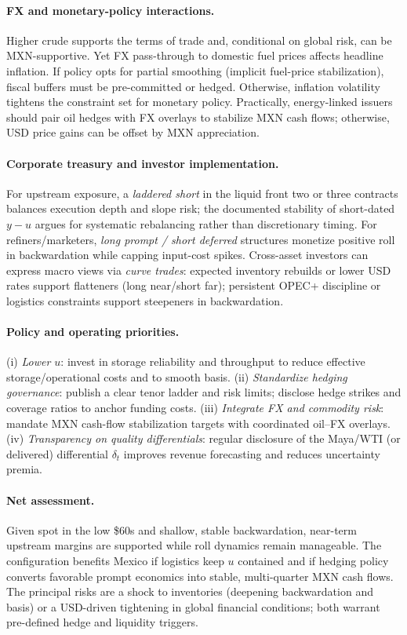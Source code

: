 \documentclass[11pt,a4paper]{article} %
\begin{document}
\paragraph{FX and monetary-policy interactions.}
Higher crude supports the terms of trade and, conditional on global risk, can be MXN-supportive. Yet FX pass-through to domestic fuel prices affects headline inflation. If policy opts for partial smoothing (implicit fuel-price stabilization), fiscal buffers must be pre-committed or hedged. Otherwise, inflation volatility tightens the constraint set for monetary policy. Practically, energy-linked issuers should pair oil hedges with FX overlays to stabilize MXN cash flows; otherwise, USD price gains can be offset by MXN appreciation.

\paragraph{Corporate treasury and investor implementation.}
For upstream exposure, a \emph{laddered short} in the liquid front two or three contracts balances execution depth and slope risk; the documented stability of short-dated \(y-u\) argues for systematic rebalancing rather than discretionary timing. For refiners/marketers, \emph{long prompt / short deferred} structures monetize positive roll in backwardation while capping input-cost spikes. Cross-asset investors can express macro views via \emph{curve trades}: expected inventory rebuilds or lower USD rates support flatteners (long near/short far); persistent OPEC+ discipline or logistics constraints support steepeners in backwardation.

\paragraph{Policy and operating priorities.}
(i) \emph{Lower \(u\)}: invest in storage reliability and throughput to reduce effective storage/operational costs and to smooth basis.  
(ii) \emph{Standardize hedging governance}: publish a clear tenor ladder and risk limits; disclose hedge strikes and coverage ratios to anchor funding costs.  
(iii) \emph{Integrate FX and commodity risk}: mandate MXN cash-flow stabilization targets with coordinated oil–FX overlays.  
(iv) \emph{Transparency on quality differentials}: regular disclosure of the Maya/WTI (or delivered) differential \(\delta_t\) improves revenue forecasting and reduces uncertainty premia.

\paragraph{Net assessment.}
Given spot in the low \$60s and shallow, stable backwardation, near-term upstream margins are supported while roll dynamics remain manageable. The configuration benefits Mexico if logistics keep \(u\) contained and if hedging policy converts favorable prompt economics into stable, multi-quarter MXN cash flows. The principal risks are a shock to inventories (deepening backwardation and basis) or a USD-driven tightening in global financial conditions; both warrant pre-defined hedge and liquidity triggers.
\end{document}
